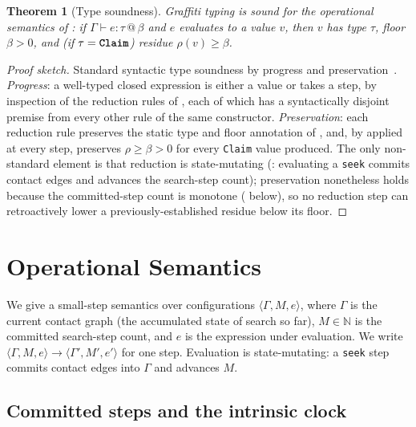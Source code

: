 \documentclass[11pt,twocolumn,a4paper]{article}
\theoremstyle{thmstyle}
\newtheorem{theorem}{Theorem}[section]
\theoremstyle{definition}
\theoremstyle{remark}
\newcommand{\N}{\mathbb{N}}
\newcommand{\Gph}{\Gamma}
\newcommand{\flo}{\beta}
\newcommand{\rec}{M}
\newcommand{\res}{\rho}
\newcommand{\stepto}{\longrightarrow}
\newcommand{\tm}[1]{\textbf{\texttt{#1}}}
\begin{document}
\begin{theorem}[Type soundness]
\label{thm:soundness}
Graffiti typing is sound for the operational semantics of
: if $\Gamma\vdash e:\tau\,@\,\flo$ and $e$ evaluates
to a value $v$, then $v$ has type $\tau$, floor $\flo>0$, and (if
$\tau=\tm{Claim}$) residue $\res(v)\ge\flo$.
\end{theorem}

\begin{proof}[Proof sketch]
Standard syntactic type soundness by progress and
preservation~\citep{pierce2002types,wright1994syntactic}. \emph{Progress}:
a well-typed closed expression is either a value or takes a step, by
inspection of the reduction rules of , each of which
has a syntactically disjoint premise from every other rule of the same
constructor. \emph{Preservation}: each reduction rule preserves the
static type and floor annotation of , and, by
 applied at every step, preserves $\res\ge\flo>0$ for
every \texttt{Claim} value produced. The only non-standard element is that
reduction is state-mutating (: evaluating a
\texttt{seek} commits contact edges and advances the search-step count);
preservation nonetheless holds because the committed-step count is
monotone ( below), so no reduction step can
retroactively lower a previously-established residue below its floor.
\end{proof}

\section{Operational Semantics}
\label{sec:semantics}

We give a small-step semantics over configurations
$\langle\Gph,\rec,e\rangle$, where $\Gph$ is the current contact graph
(the accumulated state of search so far), $\rec\in\N$ is the committed
search-step count, and $e$ is the expression under evaluation. We write
$\langle\Gph,\rec,e\rangle\stepto\langle\Gph',\rec',e'\rangle$ for one
step. Evaluation is state-mutating: a \texttt{seek} step commits contact
edges into $\Gph$ and advances $\rec$.

\subsection{Committed steps and the intrinsic clock}
\end{document}
